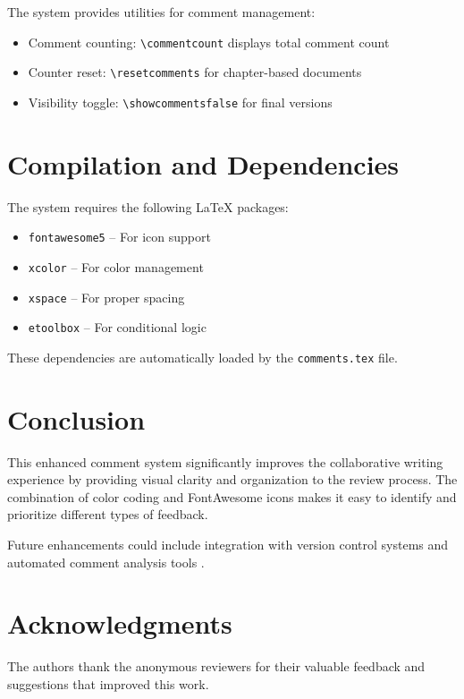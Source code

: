 \documentclass[review]{elsarticle}
\begin{document}
The system provides utilities for comment management:


\begin{itemize}
\item Comment counting: \verb|\commentcount| displays total comment count
\item Counter reset: \verb|\resetcomments| for chapter-based documents
\item Visibility toggle: \verb|\showcommentsfalse| for final versions
\end{itemize}

\section{Compilation and Dependencies}


The system requires the following LaTeX packages:
\begin{itemize}
\item \texttt{fontawesome5} -- For icon support
\item \texttt{xcolor} -- For color management  
\item \texttt{xspace} -- For proper spacing
\item \texttt{etoolbox} -- For conditional logic
\end{itemize}

These dependencies are automatically loaded by the \texttt{comments.tex} file.

\section{Conclusion}

This enhanced comment system significantly improves the collaborative writing experience by providing visual clarity and organization to the review process. The combination of color coding and FontAwesome icons makes it easy to identify and prioritize different types of feedback.


Future enhancements could include integration with version control systems and automated comment analysis tools \cite{Lamport:LaTeX}.


\vspace{0.5cm}
\noindent\commentcount

\section*{Acknowledgments}

The authors thank the anonymous reviewers for their valuable feedback and suggestions that improved this work.



\end{document}
